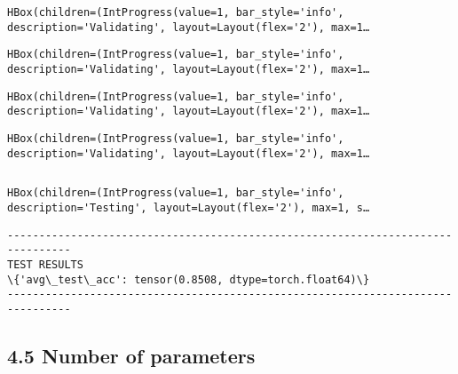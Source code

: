 \documentclass[10pt]{article}
\begin{document}
    
    
    \begin{verbatim}
HBox(children=(IntProgress(value=1, bar_style='info', description='Validating', layout=Layout(flex='2'), max=1…
    \end{verbatim}

    
    
    \begin{verbatim}
HBox(children=(IntProgress(value=1, bar_style='info', description='Validating', layout=Layout(flex='2'), max=1…
    \end{verbatim}

    
    
    \begin{verbatim}
HBox(children=(IntProgress(value=1, bar_style='info', description='Validating', layout=Layout(flex='2'), max=1…
    \end{verbatim}

    
    
    \begin{verbatim}
HBox(children=(IntProgress(value=1, bar_style='info', description='Validating', layout=Layout(flex='2'), max=1…
    \end{verbatim}

    
    \begin{Verbatim}[commandchars=\\\{\}]

    \end{Verbatim}

    
    \begin{verbatim}
HBox(children=(IntProgress(value=1, bar_style='info', description='Testing', layout=Layout(flex='2'), max=1, s…
    \end{verbatim}

    
    \begin{Verbatim}[commandchars=\\\{\}]
--------------------------------------------------------------------------------
TEST RESULTS
\{'avg\_test\_acc': tensor(0.8508, dtype=torch.float64)\}
--------------------------------------------------------------------------------

    \end{Verbatim}

    \hypertarget{number-of-parameters}{%
\subsection*{4.5 Number of parameters}\label{number-of-parameters}}
\end{document}
